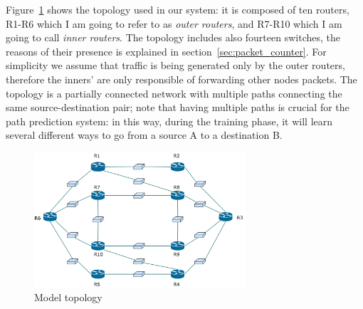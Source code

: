 Figure~\ref{fig:topology} shows the topology used in our system: it is composed of ten routers, R1-R6 which I am going to refer to as \textit{outer routers}, and R7-R10 which I am going to call \textit{inner routers}. The topology includes also fourteen switches, the reasons of their presence is explained in section~\ref{sec:packet_counter}. For simplicity we assume that traffic is being generated only by the outer routers, therefore the inners' are only responsible of forwarding other nodes packets. The topology is a partially connected network with multiple paths connecting the same source-destination pair; note that having multiple paths is crucial for the path prediction system: in this way, during the training phase, it will learn several different ways to go from a source A to a destination B.
\begin{figure}[h]
\centering
\includegraphics[width=0.7\textwidth, keepaspectratio]{img/network_arch}
\caption{Model topology}
\label{fig:topology}

\end{figure}
